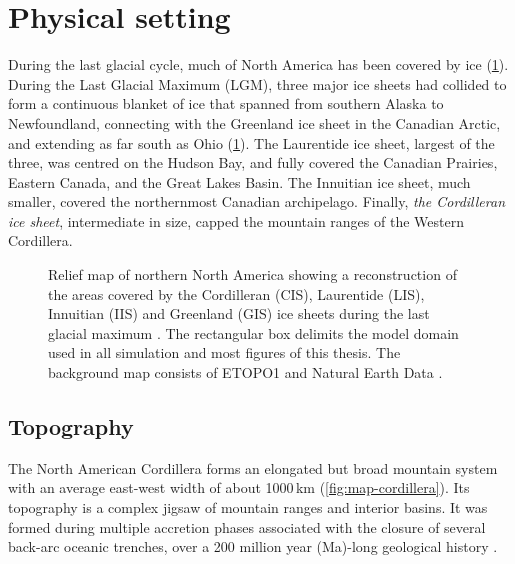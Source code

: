 \documentclass{article}
\newcommand{\chem}[1]{\ensuremath{\mathrm{#1}}}
\begin{document}
\section{Physical setting}

During the last glacial cycle, much of North America has been covered by ice
(\cref{fig:map-northamerica}).
During the Last Glacial Maximum (LGM), three major ice sheets had collided to
form a continuous blanket of ice that spanned from southern Alaska to
Newfoundland, connecting with the Greenland ice sheet in the Canadian Arctic,
and extending as far south as Ohio
(\cref{fig:map-northamerica}). The Laurentide ice
sheet, largest of the three, was centred on the Hudson Bay,
and fully covered the Canadian Prairies, Eastern Canada, and the Great Lakes
Basin. The Innuitian ice sheet, much smaller, covered the northernmost Canadian
archipelago. Finally, \emph{the Cordilleran ice sheet}, intermediate in size,
capped the mountain
ranges of the Western Cordillera.

\begin{figure}
  \centering
  \caption{Relief map of northern North America showing a reconstruction of the
           areas covered by the Cordilleran (CIS), Laurentide (LIS), Innuitian
           (IIS) and Greenland (GIS) ice sheets during the last glacial maximum
           \citep[21.4 to 16.8\,cal\,\chem{^{14}C}\,kyr\,BP,][]{Dyke.2004}.
           The rectangular box delimits the model domain used in all simulation
           and most figures of this thesis. The background
           map consists of ETOPO1 \citep{Amante.Eakins.2009} and Natural Earth
           Data \citep{Patterson.Kelso.2014}.}
  \label{fig:map-northamerica}
\end{figure}

\subsection{Topography}

The North American Cordillera forms an elongated but broad mountain system with
an average east-west width of about 1000\,km (\cref{fig:map-cordillera}). Its
topography is a complex jigsaw of mountain ranges and interior basins. It was
formed during multiple accretion phases associated with the closure of several
back-arc oceanic trenches, over a 200 million year (Ma)-long geological history
\citep{Sigloch.Mihalynuk.2013}.
\end{document}
